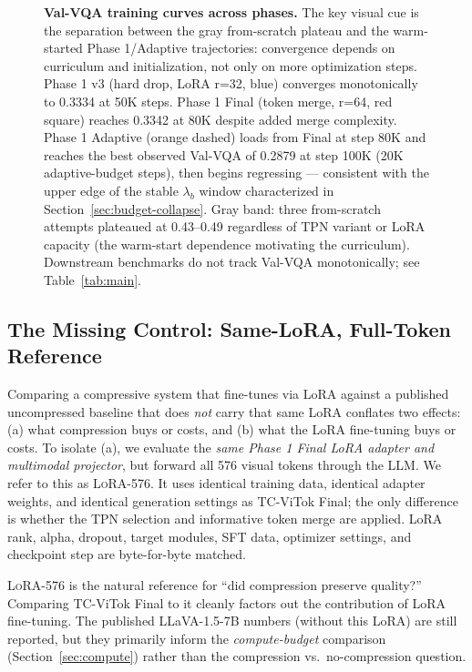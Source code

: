 \documentclass{article}
\begin{document}
\begin{figure}[t]
\caption{\textbf{Val-VQA training curves across phases.}
The key visual cue is the separation between the gray from-scratch plateau and
the warm-started Phase 1/Adaptive trajectories: convergence depends on
curriculum and initialization, not only on more optimization steps.
Phase 1 v3 (hard drop, LoRA r=32, blue) converges monotonically to 0.3334 at 50K
steps. Phase 1 Final (token merge, r=64, red square) reaches 0.3342 at 80K
despite added merge complexity. Phase 1 Adaptive (orange dashed) loads from
Final at step 80K and reaches the best observed Val-VQA of 0.2879 at step 100K
(20K adaptive-budget steps), then begins regressing — consistent with the upper
edge of the stable $\lambda_b$ window characterized in
Section~\ref{sec:budget-collapse}. Gray band: three from-scratch attempts
plateaued at 0.43--0.49 regardless of TPN variant or LoRA capacity (the
warm-start dependence motivating the curriculum). Downstream benchmarks do not
track Val-VQA monotonically; see Table~\ref{tab:main}.}
\label{fig:convergence}
\end{figure}

\subsection{The Missing Control: Same-LoRA, Full-Token Reference}
\label{sec:control}

Comparing a compressive system that fine-tunes via LoRA against a published
uncompressed baseline that does \emph{not} carry that same LoRA conflates
two effects: (a) what compression buys or costs, and (b) what the LoRA
fine-tuning buys or costs. To isolate (a), we evaluate the
\emph{same Phase 1 Final LoRA adapter and multimodal projector}, but
forward all 576 visual tokens through the LLM. We refer to this as
\textsc{LoRA-576}. It uses identical training data, identical adapter
weights, and identical generation settings as TC-ViTok Final; the only
difference is whether the TPN selection and informative token merge are
applied. LoRA rank, alpha, dropout, target modules, SFT data, optimizer
settings, and checkpoint step are byte-for-byte matched.

\textsc{LoRA-576} is the natural reference for ``did compression preserve
quality?'' Comparing TC-ViTok Final to it cleanly factors out the
contribution of LoRA fine-tuning. The published LLaVA-1.5-7B numbers (without
this LoRA) are still reported, but they primarily inform the
\emph{compute-budget} comparison (Section~\ref{sec:compute}) rather than the
compression vs.\ no-compression question.
\end{document}
